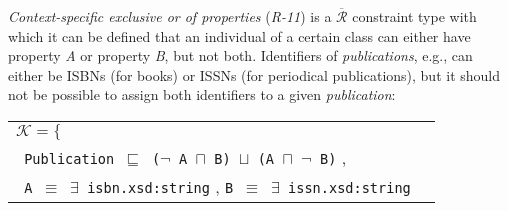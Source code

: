 \documentclass{acm_proc_article-sp}
\newcommand{\ms}[1]{%
  \texttt{#1}
}
\newenvironment{DL}{
  \vspace{0cm}
  \begin{tabular}{l l}

}{
  \end{tabular}
}
\begin{document}
%
%
%
{\em Context-specific exclusive or of properties} (\emph{R-11}) is a $\overline{\mathcal{R}}$ constraint type 
with which it can be defined that an individual of a certain class can either have property \emph{A} or property \emph{B}, but not both.
Identifiers of \emph{publications}, e.g., can either be ISBNs (for books) or ISSNs (for periodical publications), but it should not be possible to assign both identifiers to a given \emph{publication}:
{\scriptsize
\begin{center}
\begin{DL} 
$\mathcal{K}=\{$ \\ 
 \ms{ Publication $\sqsubseteq$ ($\neg$ A $\sqcap$ B) $\sqcup$ (A $\sqcap$ $\neg$ B)}, \\
 \ms{ A $\equiv	$ $\exists$ isbn.xsd:string}, \ms{B $\equiv$ $\exists$ issn.xsd:string}\\
\end{DL}
\end{center}
}%
\end{document}
